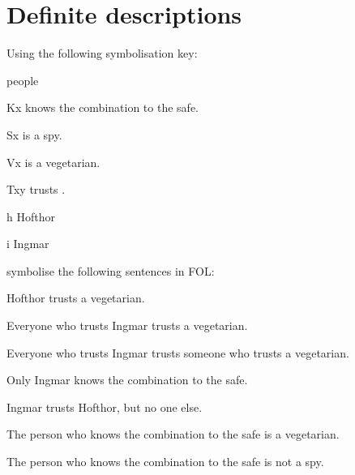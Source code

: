 \chapter{Definite descriptions}\setcounter{ProbPart}{0}
\problempart
Using the following symbolisation key:
\begin{ekey}
\item[\text{domain}] people
\item[Kx]  knows the combination to the safe.
\item[Sx]  is a spy.
\item[Vx]  is a vegetarian.
\item[Txy]  trusts .
\item[h] Hofthor
\item[i] Ingmar
\end{ekey}
symbolise the following sentences in FOL:
\begin{earg}
\item Hofthor trusts a vegetarian.
\item[] 
\item Everyone who trusts Ingmar trusts a vegetarian.
\item[] 
\item Everyone who trusts Ingmar trusts someone who trusts a vegetarian.
\item[] 
\item Only Ingmar knows the combination to the safe.
\item[] 
\item Ingmar trusts Hofthor, but no one else.
\item[] 
\item The person who knows the combination to the safe is a vegetarian.
\item[] 
\item The person who knows the combination to the safe is not a spy.
\item[] 
\end{earg}



